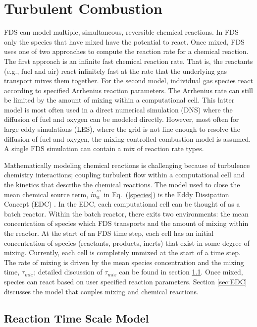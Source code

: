 \section{Turbulent Combustion}
FDS can model multiple, simultaneous, reversible chemical reactions.  In FDS only the species that have mixed have the potential to react. Once mixed, FDS uses one of two approaches to compute the reaction rate for a chemical reaction.  The first approach is an infinite fast chemical reaction rate. That is, the reactants (e.g., fuel and air) react infinitely fast at the rate that the underlying gas transport mixes them together.  For the second model, individual gas species react according to specified Arrhenius reaction parameters. The Arrhenius rate can still be limited by the amount of mixing within a computational cell. This latter model is most often used in a direct numerical simulation (DNS) where the diffusion of fuel and oxygen can be modeled directly. However, most often for large eddy simulations (LES), where the grid is not fine enough to resolve the diffusion of fuel and oxygen, the mixing-controlled combustion model is assumed. A single FDS simulation can contain a mix of reaction rate types.

Mathematically modeling chemical reactions is challenging because of turbulence chemistry interactions; coupling turbulent flow within a computational cell and the kinetics that describe the chemical reactions. The model used to close the mean chemical source term, $\dot{m}^{\prime\prime\prime}_{\alpha}$ in Eq.~(\ref{species}) is the Eddy Dissipation Concept (EDC) \cite{Magnussen:1}. In the EDC, each computational cell can be thought of as a batch reactor. Within the batch reactor, there exits two environments: the mean concentration of species which FDS transports and the amount of mixing within the reactor. At the start of an FDS time step, each cell has an initial concentration of species (reactants, products, inerts) that exist in some degree of mixing. Currently, each cell is completely unmixed at the start of a time step. The rate of mixing is driven by the mean species concentration and the mixing time, $\tau_{mix}$; detailed discussion of $\tau_{mix}$ can be found in section \ref{sec:reac_time_scale}. Once mixed, species can react based on user specified reaction parameters. Section \ref{sec:EDC} discusses the model that couples mixing and chemical reactions. 

\subsection{Reaction Time Scale Model}
\label{sec:reac_time_scale}

